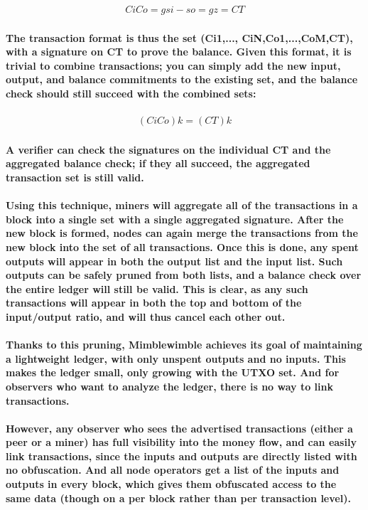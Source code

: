 \documentclass{article}
\begin{document}
\begin{eqnarray}
  Ci Co=g si -  so=gz=CT
\end{eqnarray}

\paragraph{The transaction format is thus the set (Ci1,..., CiN,Co1,...,CoM,CT), with a signature on CT to prove the balance.  Given this format, it is trivial to combine transactions; you can simply add the new input, output, and balance commitments to the existing set, and the balance check should still succeed with the combined sets:}

\begin{eqnarray}
  (  Ci Co)k= (CT)k
\end{eqnarray}

\paragraph{A verifier can check the signatures on the individual CT and the aggregated balance check; if they all succeed, the aggregated transaction set is still valid.}

\paragraph{Using this technique, miners will aggregate all of the transactions in a block into a single set with a single aggregated signature.  After the new block is formed, nodes can again merge the transactions from the new block into the set of all transactions.  Once this is done, any spent outputs will appear in both the output list and the input list.  Such outputs can be safely pruned from both lists, and a balance check over the entire ledger will still be valid.  This is clear, as any such transactions will appear in both the top and bottom of the input/output ratio, and will thus cancel each other out.  }

\paragraph{Thanks to this pruning, Mimblewimble achieves its goal of maintaining a lightweight ledger, with only unspent outputs and no inputs.  This makes the ledger small, only growing with the UTXO set.  And for observers who want to analyze the ledger, there is no way to link transactions.}

\paragraph{However, any observer who sees the advertised transactions (either a peer or a miner) has full visibility into the money flow, and can easily link transactions, since the inputs and outputs are directly listed with no obfuscation.  And all node operators get a list of the inputs and outputs in every block, which gives them obfuscated access to the same data (though on a per block rather than per transaction level).}
\end{document}
